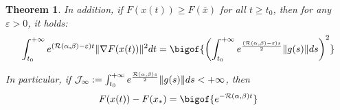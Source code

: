 \documentclass[reqno]{amsart}
\theoremstyle{plain}
\newtheorem{theorem}{Theorem}	%
\theoremstyle{definition}
\theoremstyle{remark}
\DeclarePairedDelimiter{\norm}{\lVert}{\rVert}	%
\newcommand{\Jb}{\mathcal{J}}
\newcommand{\Rb}{\mathcal{R}}
\begin{document}
\begin{theorem}
	
In addition, if $F(x(t))\geq F(\bar{x})$ for all $t\geq t_{0}$, then for any $\varepsilon>0$, it holds:
\begin{equation}\label{estimate grad basic teo first inexact}
	\int_{t_{0}}^{+\infty}e^{(\Rb(\alpha,\beta)-\varepsilon)t}\norm{\nabla F(x(t))}^2dt =\bigof{\left(\int_{t_{0}}^{+\infty}e^{\frac{(\Rb(\alpha,\beta)-\varepsilon)s}{2}}\norm{g(s)}ds\right)^{2}}
\end{equation} 
	
	In particular, if $\Jb_{\infty}:=\int_{t_{0}}^{+\infty}e^{\frac{\Rb(\alpha,\beta)s}{2}}\norm{g(s)}ds <+\infty$, then
	\begin{equation}\label{estimate gap perturbed 2 strong}
		F(x(t))- F(x_{\ast}) = \bigof{e^{-\Rb(\alpha,\beta)t}}
	\end{equation}
\end{theorem}
\end{document}
